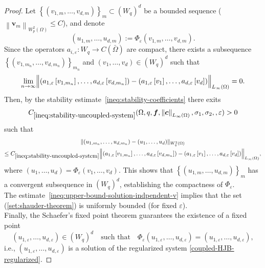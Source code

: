 \documentclass[final,onefignum,onetabnum]{mousaviart}
\begin{document}
\begin{proof}
		Let $\left\lbrace (v_{1,m}, \dots, v_{d,m})\right\rbrace _m \subset (W_q)^d$ be a bounded sequence ($\left\|  \boldsymbol{v}_m \right\|_{W^{2}_p(\Omega)} \le C  $), and denote
		\[
		(u_{1,m}, \dots, u_{d,m}) := \Phi_{\varepsilon}(v_{1,m}, \dots, v_{d,m}).
		\]
		Since the operators $a_{i,\varepsilon} : W_q \to C(\bar{\Omega})$ are compact, there exists a subsequence 
		$\left\lbrace (v_{1,m_n}, \dots, v_{d,m_n})\right\rbrace_{m_n} $ and $(v_1, \dots, v_d) \in (W_q)^d$ such that
		\begin{equation}
			\label{lim:subsequence-a}
			\lim_{n \to \infty} 
			\Bigl\| (a_{1,\varepsilon}\left[ v_{1,m_n}\right] , \dots, a_{d,\varepsilon}\left[ v_{d,m_n}\right] )
			- (a_{1,\varepsilon}\left[ v_1\right] , \dots, a_{d,\varepsilon}\left[ v_d \right] ) \Bigr\|_{L_\infty(\Omega)} = 0.
		\end{equation}
		Then, by the stability estimate~\eqref{ineq:stability-coefficients} there exits
		\[
		C_{\ref{ineq:stability-uncoupled-system}}(\Omega, q, \boldsymbol{f}, \left\| \boldsymbol{c} \right\|_{L_\infty(\Omega)} , \sigma_1, \sigma_2,
		, \varepsilon)>0
		\]
		such that
		\begin{multline}
			\label{ineq:stability-uncoupled-system}
			\| (u_{1,m_n}, \dots, u_{d,m_n}) - (u_1, \dots, u_d) \|_{W^{2}_q(\Omega)} \\
			\le C_{\ref{ineq:stability-uncoupled-system}}
			\Bigl\| (a_{1,\varepsilon}\left[ v_{1,m_n}\right] , \dots, a_{d,\varepsilon}\left[ v_{d,m_n}\right] )
			- (a_{1,\varepsilon}\left[ v_1\right] , \dots, a_{d,\varepsilon}\left[ v_d\right] ) \Bigr\|_{L_\infty(\Omega)},
		\end{multline}
		where $(u_1, \dots, u_d) = \Phi_{\varepsilon}(v_1, \dots, v_d)$. 
		This shows that $\left\lbrace (u_{1,m}, \dots, u_{d,m})\right\rbrace_m $ has a convergent subsequence in $(W_q)^d$, establishing the compactness of $\Phi_{\varepsilon}$.
		\\
		The estimate~\eqref{ineq:upper-bound-solution-indpendent-v} implies that the set (\ref{set:shauder-theorem}) is uniformly bounded (for fixed $\varepsilon$). 
		\\
		Finally, the Schaefer's fixed point theorem guarantees the existence of a fixed point
		\[
		(u_{1, \varepsilon}, \dots, u_{d, \varepsilon}) \in (W_q)^d \quad \text{such that} \quad 
		\Phi_{\varepsilon}(u_{1, \varepsilon}, \dots, u_{d, \varepsilon}) = (u_{1, \varepsilon}, \dots, u_{d, \varepsilon}),
		\]
		i.e., $(u_{1, \varepsilon}, \dots, u_{d, \varepsilon})$ is a solution of the regularized system \eqref{coupled-HJB-regularized}. 
	\end{proof}
\end{document}
